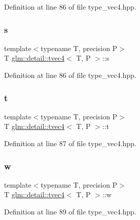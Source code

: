 Definition at line 86 of file type\+\_\+vec4.\+hpp.

\mbox{\label{structglm_1_1detail_1_1tvec4_a82cbced4cbd070056c5acbc1d4d4906f}} 
\subsubsection{\texorpdfstring{s}{s}}
{\footnotesize\ttfamily template$<$typename T, precision P$>$ \\
T \hyperlink{structglm_1_1detail_1_1tvec4}{glm\+::detail\+::tvec4}$<$ T, P $>$\+::s}



Definition at line 86 of file type\+\_\+vec4.\+hpp.

\mbox{\label{structglm_1_1detail_1_1tvec4_a7ef5d59e2d28f81eedf4a26b6023136d}} 
\subsubsection{\texorpdfstring{t}{t}}
{\footnotesize\ttfamily template$<$typename T, precision P$>$ \\
T \hyperlink{structglm_1_1detail_1_1tvec4}{glm\+::detail\+::tvec4}$<$ T, P $>$\+::t}



Definition at line 87 of file type\+\_\+vec4.\+hpp.

\mbox{\label{structglm_1_1detail_1_1tvec4_a6b1f294d076a4a08420e7d8131a2f0ea}} 
\subsubsection{\texorpdfstring{w}{w}}
{\footnotesize\ttfamily template$<$typename T, precision P$>$ \\
T \hyperlink{structglm_1_1detail_1_1tvec4}{glm\+::detail\+::tvec4}$<$ T, P $>$\+::w}



Definition at line 89 of file type\+\_\+vec4.\+hpp.

